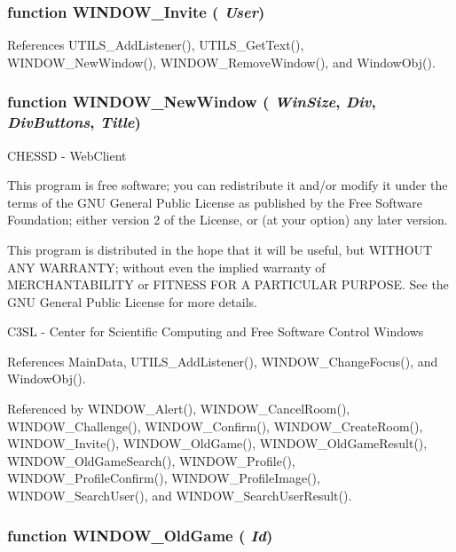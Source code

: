\subsubsection{\setlength{\rightskip}{0pt plus 5cm}function WINDOW\_\-Invite ( {\em User})}\label{window_2window_8js_a0b254ab6a166342fef8e2ff561e155d}




References UTILS\_\-AddListener(), UTILS\_\-GetText(), WINDOW\_\-NewWindow(), WINDOW\_\-RemoveWindow(), and WindowObj().
\subsubsection{\setlength{\rightskip}{0pt plus 5cm}function WINDOW\_\-NewWindow ( {\em WinSize}, \/   {\em Div}, \/   {\em DivButtons}, \/   {\em Title})}\label{window_2window_8js_ab201d1f7f6d972025e93c498a852ff8}


CHESSD - WebClient

This program is free software; you can redistribute it and/or modify it under the terms of the GNU General Public License as published by the Free Software Foundation; either version 2 of the License, or (at your option) any later version.

This program is distributed in the hope that it will be useful, but WITHOUT ANY WARRANTY; without even the implied warranty of MERCHANTABILITY or FITNESS FOR A PARTICULAR PURPOSE. See the GNU General Public License for more details.

C3SL - Center for Scientific Computing and Free Software Control Windows 

References MainData, UTILS\_\-AddListener(), WINDOW\_\-ChangeFocus(), and WindowObj().

Referenced by WINDOW\_\-Alert(), WINDOW\_\-CancelRoom(), WINDOW\_\-Challenge(), WINDOW\_\-Confirm(), WINDOW\_\-CreateRoom(), WINDOW\_\-Invite(), WINDOW\_\-OldGame(), WINDOW\_\-OldGameResult(), WINDOW\_\-OldGameSearch(), WINDOW\_\-Profile(), WINDOW\_\-ProfileConfirm(), WINDOW\_\-ProfileImage(), WINDOW\_\-SearchUser(), and WINDOW\_\-SearchUserResult().
\subsubsection{\setlength{\rightskip}{0pt plus 5cm}function WINDOW\_\-OldGame ( {\em Id})}\label{window_2window_8js_76f9685e2f3edd1a2ac62bd9f921da86}




